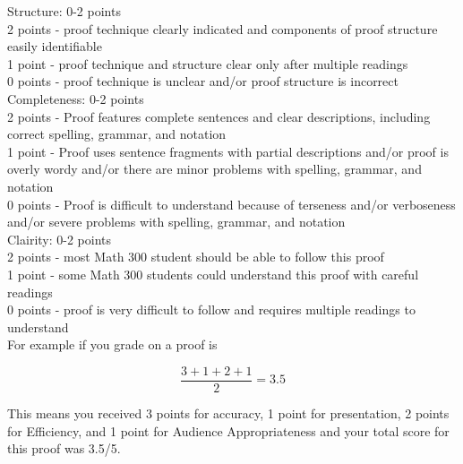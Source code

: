 \documentclass[10pt]{article}
\begin{document}
Structure: 0-2 points\\
2 points - proof technique clearly indicated and components of proof structure easily identifiable\\
1 point - proof technique and structure clear only after multiple readings\\
0 points - proof technique is unclear and/or proof structure is incorrect\\

Completeness: 0-2 points\\
2 points - Proof features complete sentences and clear descriptions, including correct spelling, grammar, and notation\\
1 point - Proof uses sentence fragments with partial descriptions and/or proof is overly wordy and/or there are minor problems with spelling, grammar, and notation\\
0 points - Proof is difficult to understand because of terseness and/or verboseness and/or severe problems with spelling, grammar, and notation\\

Clairity: 0-2 points\\
2 points - most Math 300 student should be able to follow this proof\\
1 point - some  Math 300 students could understand this proof with careful readings\\
0 points - proof is very difficult to follow and requires multiple readings  to understand\\

For example if you grade on a proof is

$$\frac{3+1+2+1}{2}=3.5$$

This means you received 3 points for accuracy, 1 point for presentation, 2 points for Efficiency, and 1 point for Audience Appropriateness and your total score for this proof was 3.5/5.
\end{document}
